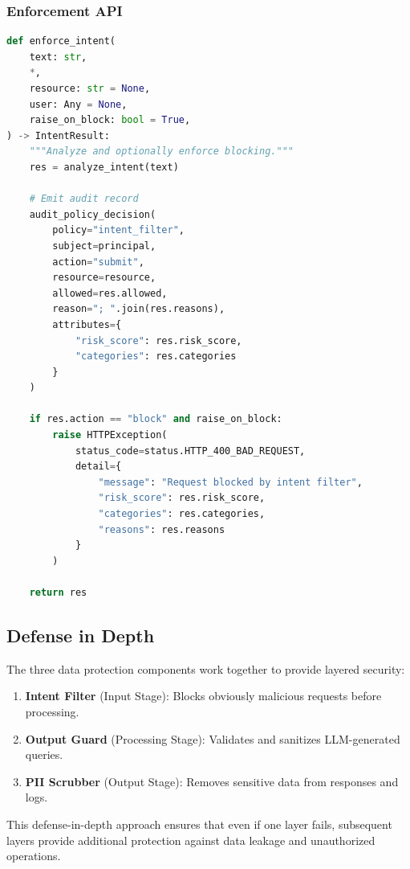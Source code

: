 \subsubsection{Enforcement API}

\begin{lstlisting}[language=Python,caption={Intent filter enforcement}]
def enforce_intent(
    text: str,
    *,
    resource: str = None,
    user: Any = None,
    raise_on_block: bool = True,
) -> IntentResult:
    """Analyze and optionally enforce blocking."""
    res = analyze_intent(text)
    
    # Emit audit record
    audit_policy_decision(
        policy="intent_filter",
        subject=principal,
        action="submit",
        resource=resource,
        allowed=res.allowed,
        reason="; ".join(res.reasons),
        attributes={
            "risk_score": res.risk_score,
            "categories": res.categories
        }
    )
    
    if res.action == "block" and raise_on_block:
        raise HTTPException(
            status_code=status.HTTP_400_BAD_REQUEST,
            detail={
                "message": "Request blocked by intent filter",
                "risk_score": res.risk_score,
                "categories": res.categories,
                "reasons": res.reasons
            }
        )
    
    return res
\end{lstlisting}

\subsection{Defense in Depth}
\label{subsec:defense-in-depth}

The three data protection components work together to provide layered security:

\begin{enumerate}
    \item \textbf{Intent Filter} (Input Stage): Blocks obviously malicious requests before processing.
    \item \textbf{Output Guard} (Processing Stage): Validates and sanitizes LLM-generated queries.
    \item \textbf{PII Scrubber} (Output Stage): Removes sensitive data from responses and logs.
\end{enumerate}

This defense-in-depth approach ensures that even if one layer fails, subsequent layers provide additional protection against data leakage and unauthorized operations.

